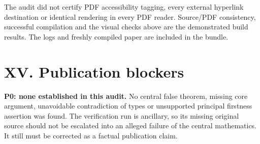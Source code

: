 \documentclass[
  10pt,
]{article}
\begin{document}
The audit did not certify PDF accessibility tagging, every external
hyperlink destination or identical rendering in every PDF reader.
Source/PDF consistency, successful compilation and the visual checks
above are the demonstrated build results. The logs and freshly compiled
paper are included in the bundle.

\section{XV. Publication blockers}\label{xv.-publication-blockers}

\textbf{P0: none established in this audit.} No central false theorem,
missing core argument, unavoidable contradiction of types or unsupported
principal firstness assertion was found. The verification run is
ancillary, so its missing original source should not be escalated into
an alleged failure of the central mathematics. It still must be
corrected as a factual publication claim.
\end{document}
